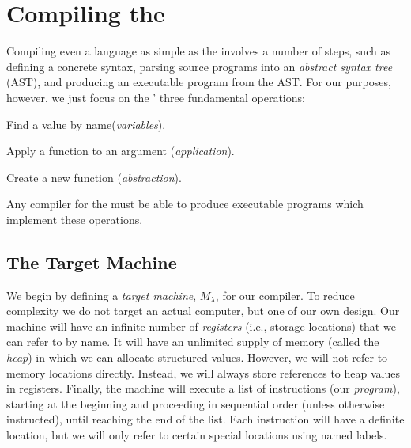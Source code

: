 \documentclass[12pt]{report}
\begin{document}

\section{Compiling the \LamA}

Compiling even a language as simple as the \lamA involves a number of
steps, such as defining a concrete syntax, parsing source programs
into an \emph{abstract syntax tree} (AST), and producing an executable
program from the AST. For our purposes, however, we just focus on the
\lamA' three fundamental operations:
\begin{description}
\item Find a value by name(\emph{variables}).
\item Apply a function to an argument (\emph{application}).
\item Create a new function (\emph{abstraction}). 
\end{description}
Any compiler for the \lamA must be able to produce executable programs
which implement these operations. 

\subsection{The Target Machine}
We begin by defining a \emph{target machine}, $M_\lambda$, for our compiler. To
reduce complexity we do not target an actual computer, but one of our
own design. Our machine will have an infinite number of
\emph{registers} (i.e., storage locations) that we can refer to by
name. It will have an unlimited supply of memory (called the
\emph{heap}) in which we can allocate structured values. However, we
will not refer to memory locations directly. Instead, we will always
store references to heap values in registers. Finally, the machine
will execute a list of instructions (our \emph{program}), starting at
the beginning and proceeding in sequential order (unless otherwise
instructed), until reaching the end of the list. Each instruction will
have a definite location, but we will only refer to certain special
locations using named labels.
\end{document}
